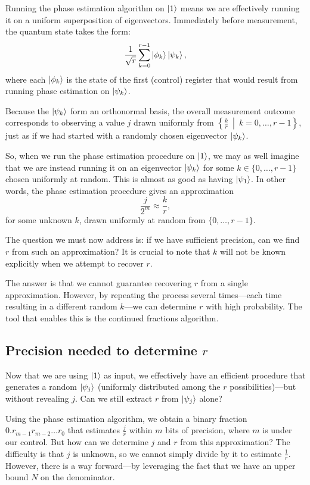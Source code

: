 Running the phase estimation algorithm on $\ket{1}$ means we are effectively running it on a uniform superposition of eigenvectors. Immediately before measurement, the quantum state takes the form:
\[
\frac{1}{\sqrt{r}} \sum_{k=0}^{r-1} \ket{\phi_k} \ket{\psi_k},
\]
where each $\ket{\phi_k}$ is the state of the first (control) register that would result from running phase estimation on $\ket{\psi_k}$.

Because the $\ket{\psi_k}$ form an orthonormal basis, the overall measurement outcome corresponds to observing a value $j$ drawn uniformly from $\left\{ \frac{k}{r} \ \middle| \ k = 0, \ldots, r-1 \right\}$, just as if we had started with a randomly chosen eigenvector $\ket{\psi_k}$.

So, when we run the phase estimation procedure on $\ket{1}$, we may as well imagine that we are instead running it on an eigenvector $\ket{\psi_k}$ for some $k \in \{0,\ldots, r-1\}$ chosen uniformly at random. This is almost as good as having $\ket{\psi_1}$. In other words, the phase estimation procedure gives an approximation
\[
\frac{j}{2^m} \approx \frac{k}{r},
\]
for some unknown $k$, drawn uniformly at random from $\{0, \ldots, r - 1\}$.

The question we must now address is: if we have sufficient precision, can we find $r$ from such an approximation? It is crucial to note that $k$ will not be known explicitly when we attempt to recover $r$.

The answer is that we cannot guarantee recovering $r$ from a single approximation. However, by repeating the process several times—each time resulting in a different random $k$—we can determine $r$ with high probability. The tool that enables this is the continued fractions algorithm.

\subsection{Precision needed to determine \texorpdfstring{$r$}{r}}

Now that we are using $\ket{1}$ as input, we effectively have an efficient procedure that generates a random $\ket{\psi_j}$ (uniformly distributed among the $r$ possibilities)—but without revealing $j$. Can we still extract $r$ from $\ket{\psi_j}$ alone?

Using the phase estimation algorithm, we obtain a binary fraction $0.r_{m-1}r_{m-2}\ldots r_0$ that estimates $\frac{j}{r}$ within $m$ bits of precision, where $m$ is under our control. But how can we determine $j$ and $r$ from this approximation? The difficulty is that $j$ is unknown, so we cannot simply divide by it to estimate $\frac{1}{r}$. However, there is a way forward—by leveraging the fact that we have an upper bound $N$ on the denominator.

